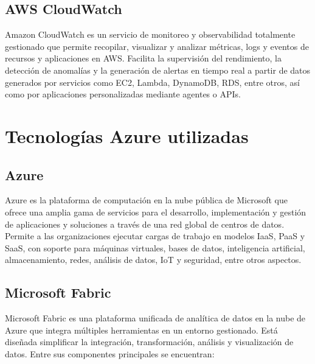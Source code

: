 \subsection{AWS CloudWatch}

Amazon CloudWatch \citep{aws_cloudwatch}  es un servicio de monitoreo y observabilidad totalmente gestionado que permite recopilar, visualizar y analizar métricas, logs y eventos de recursos y aplicaciones en AWS. Facilita la supervisión del rendimiento, la detección de anomalías y la generación de alertas en tiempo real a partir de datos generados por servicios como EC2, Lambda, DynamoDB, RDS, entre otros, así como por aplicaciones personalizadas mediante agentes o APIs. 




\section{Tecnologías Azure utilizadas}

\subsection{Azure}
Azure \citep{azure} es la plataforma de computación en la nube pública de Microsoft que ofrece una amplia gama de servicios para el desarrollo, implementación y gestión de aplicaciones y soluciones a través de una red global de centros de datos. Permite a las organizaciones ejecutar cargas de trabajo en modelos IaaS, PaaS y SaaS, con soporte para máquinas virtuales, bases de datos, inteligencia artificial, almacenamiento, redes, análisis de datos, IoT y seguridad, entre otros aspectos.


\subsection{Microsoft Fabric}
Microsoft Fabric \citep{azure_fabric} es una plataforma unificada de analítica de datos en la nube de Azure que integra múltiples herramientas en un entorno gestionado. Está diseñada simplificar la integración, transformación, análisis y visualización de datos. Entre sus componentes principales se encuentran: 

